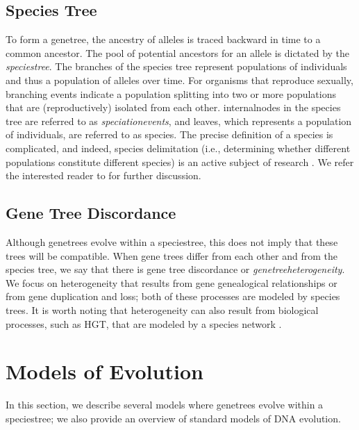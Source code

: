 \subsection{Species Tree}
\label{sec:background-species}
To form a \gls{genetree}, the ancestry of \glspl{allele} is traced backward in time to a common ancestor. 
The pool of potential ancestors for an allele is dictated by the \textit{\gls{speciestree}}.
The branches of the species tree represent populations of individuals and thus a population of alleles over time.
For organisms that reproduce sexually, branching events indicate a population splitting into two or more populations that are (reproductively) isolated from each other.
\Glspl{internalnode} in the species tree are referred to as  \textit{\glspl{speciationevent}}, and leaves, which represents a population of individuals, are referred to as species.
The precise definition of a species is complicated, and indeed, species delimitation (i.e., determining whether different populations constitute different species) is an active subject of research \cite{wiens2007species, omeara2009new, solis2015bayesian, rabiee2019soda}.
We refer the interested reader to \cite{avise1997phylogenetics} for further discussion.

\subsection{Gene Tree Discordance}
\label{sec:background-discordance}
Although \glspl{genetree} evolve within a \gls{speciestree}, this does not imply that these trees will be \gls{compatible}.
When gene trees differ from each other and from the species tree, we say that there is gene tree discordance or \textit{\gls{genetreeheterogeneity}}.
We focus on heterogeneity that results from gene genealogical relationships or from gene duplication and loss; both of these processes are modeled by species trees.
It is worth noting that heterogeneity can also result from biological processes, such as \gls{HGT}, that are modeled by a species network \cite{nakhleh2011evolutionary, huson2010phylogenetic}.

\section{Models of Evolution}
\label{sec:background-model}
In this section, we describe several models where \glspl{genetree} evolve within a \gls{speciestree}; we also provide an overview of standard models of DNA  evolution.

